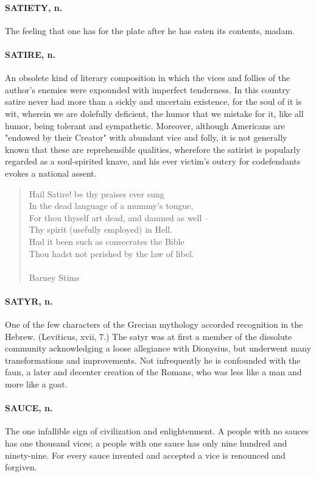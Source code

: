 \documentclass[11pt]{article}
\begin{document}
\paragraph{SATIETY, n.}  The feeling that one has for the plate after he has eaten
its contents, madam.

\paragraph{SATIRE, n.}  An obsolete kind of literary composition in which the
vices and follies of the author's enemies were expounded with
imperfect tenderness.  In this country satire never had more than a
sickly and uncertain existence, for the soul of it is wit, wherein we
are dolefully deficient, the humor that we mistake for it, like all
humor, being tolerant and sympathetic.  Moreover, although Americans
are "endowed by their Creator" with abundant vice and folly, it is not
generally known that these are reprehensible qualities, wherefore the
satirist is popularly regarded as a soul-spirited knave, and his ever
victim's outcry for codefendants evokes a national assent.

\begin{quote}   Hail Satire! be thy praises ever sung \\
  In the dead language of a mummy's tongue, \\
  For thou thyself art dead, and damned as well -- \\
  Thy spirit (usefully employed) in Hell. \\
  Had it been such as consecrates the Bible \\
  Thou hadst not perished by the law of libel. \\
 \\
Barney Stims \end{quote}


\paragraph{SATYR, n.}  One of the few characters of the Grecian mythology accorded
recognition in the Hebrew.  (Leviticus, xvii, 7.)  The satyr was at
first a member of the dissolute community acknowledging a loose
allegiance with Dionysius, but underwent many transformations and
improvements.  Not infrequently he is confounded with the faun, a
later and decenter creation of the Romans, who was less like a man and
more like a goat.

\paragraph{SAUCE, n.}  The one infallible sign of civilization and enlightenment.
A people with no sauces has one thousand vices; a people with one
sauce has only nine hundred and ninety-nine.  For every sauce invented
and accepted a vice is renounced and forgiven.
\end{document}
